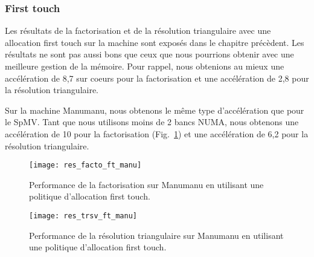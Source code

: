 \subsubsection{First touch}
Les résultats de la factorisation et de la résolution triangulaire avec une allocation first touch sur la machine  sont exposés dans le chapitre précèdent.
%
Les résultats ne sont pas aussi bons que ceux que nous pourrions obtenir avec une meilleure gestion de la mémoire.
%
Pour rappel, nous obtenions au mieux une accélération de 8,7 sur coeurs pour la factorisation et une accélération de 2,8 pour la résolution triangulaire.


Sur la machine Manumanu, nous obtenons le même type d'accélération que pour le SpMV.
%
Tant que nous utilisons moins de 2 bancs NUMA, nous obtenons une accélération de 10 pour la factorisation (Fig.~\ref{fig:res_facto_ft_manumanu}) et une accélération de 6,2 pour la résolution triangulaire.


\begin{figure}[t!]
  \centering
  \texttt{[image: res\_facto\_ft\_manu]}
  \caption{Performance de la factorisation sur Manumanu en utilisant une politique d'allocation first touch.}
  \label{fig:res_facto_ft_manumanu}
\end{figure}


\begin{figure}[t!]
  \centering
  \texttt{[image: res\_trsv\_ft\_manu]}
  \caption{Performance de la résolution triangulaire sur Manumanu en utilisant une politique d'allocation first touch.}
  \label{fig:res_trsv_ft_manumanu}
\end{figure}
